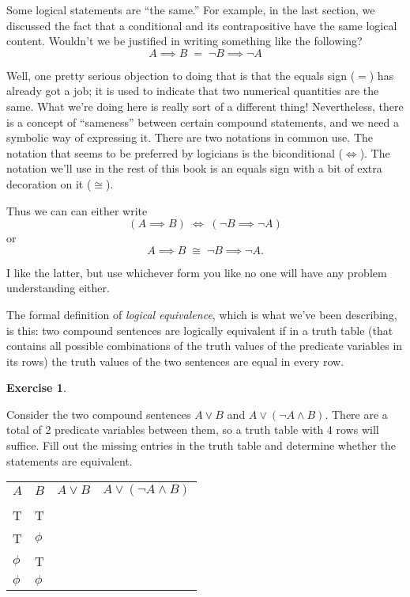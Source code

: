 \documentclass[10pt,]{book}
\theoremstyle{plain}
\theoremstyle{definition}
\theoremstyle{definition}
\newtheorem{exercise}[theorem]{Exercise}
\numberwithin{equation}{section}
\newcommand{\hrulethin}  {\noalign{\hrule height 0.04em}}
\begin{document}
    Some logical statements are ``the same.'' For example, in the last
    section, we discussed the fact that a conditional
    and its contrapositive have the same logical content. Wouldn't
    we be justified in writing something like the following?
    \begin{equation*}
      A \implies B \; = \; {\lnot}B \implies {\lnot}A
    \end{equation*}
\par

    Well, one pretty serious objection to doing that is that the
    equals sign (\(=\)) has already got a job; it is used to indicate that
    two numerical quantities are the same. What we're doing here is
    really sort of a different thing! Nevertheless, there is a concept
    of ``sameness'' between certain compound statements, and we need a
    symbolic way of expressing it. There are two notations in common
    use. The notation that seems to be preferred by logicians is the
    biconditional (\(\iff\)). The notation we'll use
    in the rest of this book is an equals sign with a bit of extra decoration
    on it (\(\cong\)).
\par

    Thus we can can either write
    \begin{equation*}
      (A \implies B) \; \iff \; ({\lnot}B \implies {\lnot}A)
    \end{equation*}
    or
    \begin{equation*}
      A \implies B \; \cong \; {\lnot}B \implies {\lnot}A.
    \end{equation*}
\par

    I like the latter, but use whichever form you like \textemdash{} no one
    will have any problem understanding either.
\par

    The formal definition of \emph{logical equivalence},
    which is what we've
    been describing, is this: two compound sentences are logically equivalent
    if in a truth table (that contains all possible combinations of the
    truth values of the predicate variables in its rows) the truth values
    of the two sentences are equal in every row.
\begin{exercise}\label{exercise-9}

        Consider the two compound sentences \(A \lor B\) and \(A \lor ({\lnot}A \land B)\).
        There are a total of 2 predicate variables between them, so a truth table
        with 4 rows will suffice. Fill out the missing entries in the truth
        table and determine whether the statements are equivalent.
\begin{tabular}{llll}
\(A\)&\(B\)&\(A \lor B\)&\(A \lor ({\lnot}A \land B)\)\tabularnewline[0pt]
&&&\tabularnewline\hrulethin
T&T&&\tabularnewline[0pt]
T&\(\phi\)&&\tabularnewline[0pt]
\(\phi\)&T&&\tabularnewline[0pt]
\(\phi\)&\(\phi\)&&
\end{tabular}
\end{exercise}
\par
\end{document}
